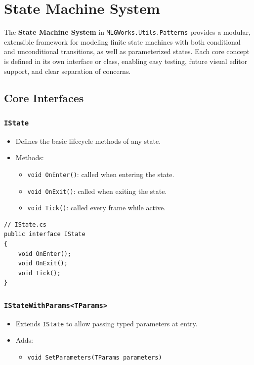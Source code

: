 \section{State Machine System}
\label{sec:state-machine}

The \textbf{State Machine System} in \texttt{MLGWorks.Utils.Patterns} provides a modular, extensible framework for modeling finite state machines with both conditional and unconditional transitions, as well as parameterized states. Each core concept is defined in its own interface or class, enabling easy testing, future visual editor support, and clear separation of concerns.

\subsection{Core Interfaces}

\subsubsection{\texttt{IState}}
\begin{itemize}
  \item Defines the basic lifecycle methods of any state.
  \item Methods:
    \begin{itemize}
      \item \verb|void OnEnter()|: called when entering the state.
      \item \verb|void OnExit()|: called when exiting the state.
      \item \verb|void Tick()|: called every frame while active.
    \end{itemize}
\end{itemize}

\begin{verbatim}
// IState.cs
public interface IState
{
    void OnEnter();
    void OnExit();
    void Tick();
}
\end{verbatim}

\subsubsection{\texttt{IStateWithParams<TParams>}}
\begin{itemize}
  \item Extends \texttt{IState} to allow passing typed parameters at entry.
  \item Adds:
    \begin{itemize}
      \item \verb|void SetParameters(TParams parameters)|
    \end{itemize}
\end{itemize}

